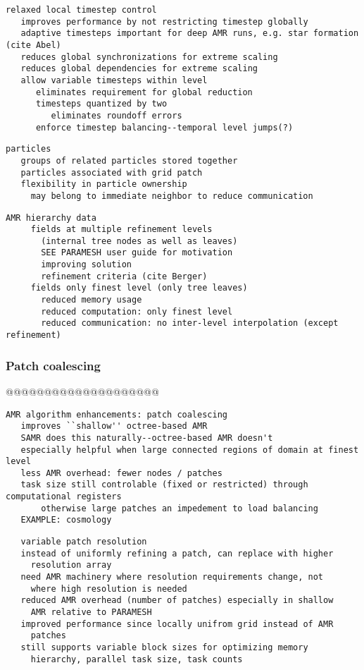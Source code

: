 \documentclass{article}
\begin{document}
\begin{verbatim}
relaxed local timestep control
   improves performance by not restricting timestep globally
   adaptive timesteps important for deep AMR runs, e.g. star formation (cite Abel)
   reduces global synchronizations for extreme scaling
   reduces global dependencies for extreme scaling
   allow variable timesteps within level
      eliminates requirement for global reduction
      timesteps quantized by two
         eliminates roundoff errors
      enforce timestep balancing--temporal level jumps(?)
\end{verbatim}

\begin{verbatim}
particles
   groups of related particles stored together
   particles associated with grid patch
   flexibility in particle ownership
     may belong to immediate neighbor to reduce communication
\end{verbatim}

\begin{verbatim}
AMR hierarchy data
     fields at multiple refinement levels 
       (internal tree nodes as well as leaves)
       SEE PARAMESH user guide for motivation
       improving solution
       refinement criteria (cite Berger)
     fields only finest level (only tree leaves)
       reduced memory usage
       reduced computation: only finest level
       reduced communication: no inter-level interpolation (except refinement)
\end{verbatim}

\subsubsection{Patch coalescing } \label{sss:patch-coalescing}

@@@@@@@@@@@@@@@@@@@@

\begin{verbatim}
AMR algorithm enhancements: patch coalescing
   improves ``shallow'' octree-based AMR
   SAMR does this naturally--octree-based AMR doesn't
   especially helpful when large connected regions of domain at finest level
   less AMR overhead: fewer nodes / patches
   task size still controlable (fixed or restricted) through computational registers
       otherwise large patches an impedement to load balancing
   EXAMPLE: cosmology
\end{verbatim}

\begin{verbatim}
   variable patch resolution
   instead of uniformly refining a patch, can replace with higher
     resolution array
   need AMR machinery where resolution requirements change, not
     where high resolution is needed
   reduced AMR overhead (number of patches) especially in shallow
     AMR relative to PARAMESH
   improved performance since locally unifrom grid instead of AMR
     patches
   still supports variable block sizes for optimizing memory
     hierarchy, parallel task size, task counts
\end{verbatim}
\end{document}
